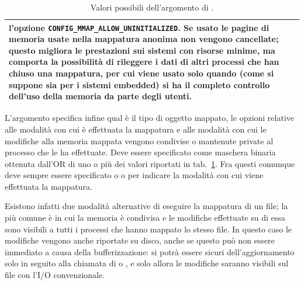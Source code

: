 \begin{table}[!htb]
\begin{tabular}[c]{|l|p{11cm}|}
                             l'opzione
                             \texttt{CONFIG\_MMAP\_ALLOW\_UNINITIALIZED}. Se
                             usato le pagine di memoria usate nella mappatura
                             anonima non vengono cancellate; questo migliora
                             le prestazioni sui sistemi con risorse minime, ma
                             comporta la possibilità di rileggere i dati di
                             altri processi che han chiuso una mappatura, per
                             cui viene usato solo quando (come si suppone sia
                             per i sistemi embedded) si ha il completo
                             controllo dell'uso della memoria da parte degli
                             utenti.\\ 
    \hline
  \end{tabular}
  \caption{Valori possibili dell'argomento  di .}
  \label{tab:file_mmap_flag}
\end{table}





L'argomento  specifica infine qual è il tipo di oggetto mappato,
le opzioni relative alle modalità con cui è effettuata la mappatura e alle
modalità con cui le modifiche alla memoria mappata vengono condivise o
mantenute private al processo che le ha effettuate. Deve essere specificato
come maschera binaria ottenuta dall'OR di uno o più dei valori riportati in
tab.~\ref{tab:file_mmap_flag}. Fra questi comunque deve sempre essere
specificato o  o  per indicare la
modalità con cui viene effettuata la mappatura.

Esistono infatti due modalità alternative di eseguire la mappatura di un file;
la più comune è  in cui la memoria è condivisa e le
modifiche effettuate su di essa sono visibili a tutti i processi che hanno
mappato lo stesso file. In questo caso le modifiche vengono anche riportate su
disco, anche se questo può non essere immediato a causa della bufferizzazione:
si potrà essere sicuri dell'aggiornamento solo in seguito alla chiamata di
 o , e solo allora le modifiche saranno visibili sul
file con l'I/O convenzionale.

